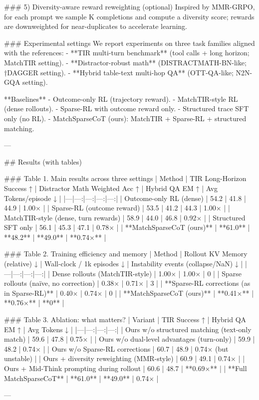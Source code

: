 ### 5) Diversity-aware reward reweighting (optional)
Inspired by MMR-GRPO, for each prompt we sample K completions and compute a diversity score; rewards are downweighted for near-duplicates to accelerate learning.

### Experimental settings
We report experiments on three task families aligned with the references:
- **TIR multi-turn benchmark** (tool calls + long horizon; MatchTIR setting).
- **Distractor-robust math** (DISTRACTMATH-BN-like; †DAGGER setting).
- **Hybrid table-text multi-hop QA** (OTT-QA-like; N2N-GQA setting).

**Baselines**
- Outcome-only RL (trajectory reward).
- MatchTIR-style RL (dense rollouts).
- Sparse-RL with outcome reward only.
- Structured trace SFT only (no RL).
- MatchSparseCoT (ours): MatchTIR + Sparse-RL + structured matching.

---

## Results (with tables)

### Table 1. Main results across three settings
| Method | TIR Long-Horizon Success ↑ | Distractor Math Weighted Acc ↑ | Hybrid QA EM ↑ | Avg Tokens/episode ↓ |
|---|---:|---:|---:|---:|
| Outcome-only RL (dense) | 54.2 | 41.8 | 44.9 | 1.00× |
| Sparse-RL (outcome reward) | 53.5 | 41.2 | 44.3 | 1.00× |
| MatchTIR-style (dense, turn rewards) | 58.9 | 44.0 | 46.8 | 0.92× |
| Structured SFT only | 56.1 | 45.3 | 47.1 | 0.78× |
| **MatchSparseCoT (ours)** | **61.0** | **48.2** | **49.0** | **0.74×** |

### Table 2. Training efficiency and memory
| Method | Rollout KV Memory (relative) ↓ | Wall-clock / 1k episodes ↓ | Instability events (collapse/NaN) ↓ |
|---|---:|---:|---:|
| Dense rollouts (MatchTIR-style) | 1.00× | 1.00× | 0 |
| Sparse rollouts (naïve, no correction) | 0.38× | 0.71× | 3 |
| **Sparse-RL corrections (as in Sparse-RL)** | 0.40× | 0.74× | 0 |
| **MatchSparseCoT (ours)** | **0.41×** | **0.76×** | **0** |

### Table 3. Ablation: what matters?
| Variant | TIR Success ↑ | Hybrid QA EM ↑ | Avg Tokens ↓ |
|---|---:|---:|---:|
| Ours w/o structured matching (text-only match) | 59.6 | 47.8 | 0.75× |
| Ours w/o dual-level advantages (turn-only) | 59.9 | 48.2 | 0.74× |
| Ours w/o Sparse-RL corrections | 60.7 | 48.9 | 0.74× (but unstable) |
| Ours + diversity reweighting (MMR-style) | 60.9 | 49.1 | 0.74× |
| Ours + Mid-Think prompting during rollout | 60.6 | 48.7 | **0.69×** |
| **Full MatchSparseCoT** | **61.0** | **49.0** | 0.74× |

---

